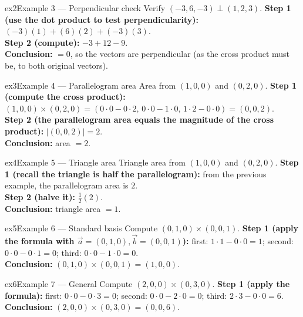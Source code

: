 \documentclass[11pt]{article}
\begin{document}
\begin{example}{ex2}{Example 3 --- Perpendicular check}
Verify $(-3,6,-3)\perp(1,2,3)$.\soln
\textbf{Step 1 (use the dot product to test perpendicularity):} $(-3)(1)+(6)(2)+(-3)(3)$.\\[3pt]
\textbf{Step 2 (compute):} $-3+12-9$.\\[3pt]
\textbf{Conclusion:} $=0$, so the vectors are perpendicular (as the cross product must be, to both original vectors).
\end{example}

\begin{example}{ex3}{Example 4 --- Parallelogram area}
Area from $(1,0,0)$ and $(0,2,0)$.\soln
\textbf{Step 1 (compute the cross product):} $(1,0,0)\times(0,2,0)=(0\cdot0-0\cdot2,\,0\cdot0-1\cdot0,\,1\cdot2-0\cdot0)=(0,0,2)$.\\[3pt]
\textbf{Step 2 (the parallelogram area equals the magnitude of the cross product):} $|(0,0,2)|=2$.\\[3pt]
\textbf{Conclusion:} area $=2$.
\end{example}

\begin{example}{ex4}{Example 5 --- Triangle area}
Triangle area from $(1,0,0)$ and $(0,2,0)$.\soln
\textbf{Step 1 (recall the triangle is half the parallelogram):} from the previous example, the parallelogram area is $2$.\\[3pt]
\textbf{Step 2 (halve it):} $\tfrac12(2)$.\\[3pt]
\textbf{Conclusion:} triangle area $=1$.
\end{example}

\begin{example}{ex5}{Example 6 --- Standard basis}
Compute $(0,1,0)\times(0,0,1)$.\soln
\textbf{Step 1 (apply the formula with $\vec a=(0,1,0),\vec b=(0,0,1)$):} first: $1\cdot1-0\cdot0=1$; second: $0\cdot0-0\cdot1=0$; third: $0\cdot0-1\cdot0=0$.\\[3pt]
\textbf{Conclusion:} $(0,1,0)\times(0,0,1)=(1,0,0)$.
\end{example}

\begin{example}{ex6}{Example 7 --- General}
Compute $(2,0,0)\times(0,3,0)$.\soln
\textbf{Step 1 (apply the formula):} first: $0\cdot0-0\cdot3=0$; second: $0\cdot0-2\cdot0=0$; third: $2\cdot3-0\cdot0=6$.\\[3pt]
\textbf{Conclusion:} $(2,0,0)\times(0,3,0)=(0,0,6)$.
\end{example}
\end{document}
